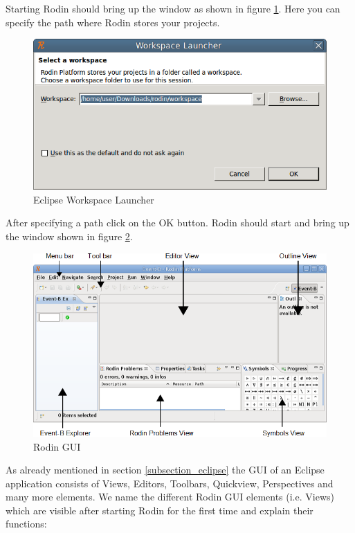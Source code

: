 Starting Rodin should bring up the window as shown in figure \ref{fig_tut_02_workspace_launcher}. Here you can specify the path where Rodin stores your projects.

\begin{figure}[!h]
\begin{center}
	\includegraphics{img/tutorial/tut_02_install1.png}
	\caption{Eclipse Workspace Launcher}
	\label{fig_tut_02_workspace_launcher}
\end{center}
\end{figure}

After specifying a path click on the \textsf{OK} button. Rodin should start and bring up the window shown in figure \ref{fig_tut_02_rodin_gui}.

\begin{figure}[!h]
\begin{center}
	\includegraphics{img/tutorial/tut_02_install2.png}
	\caption{Rodin GUI}
	\label{fig_tut_02_rodin_gui}
\end{center}
\end{figure}

As already mentioned in section \ref{subsection_eclipse} the GUI of an Eclipse application consists of Views, Editors, Toolbars, Quickview, Perspectives and many more elements. We name the different Rodin GUI elements (i.e. Views) which are visible after starting Rodin for the first time and explain their functions:

